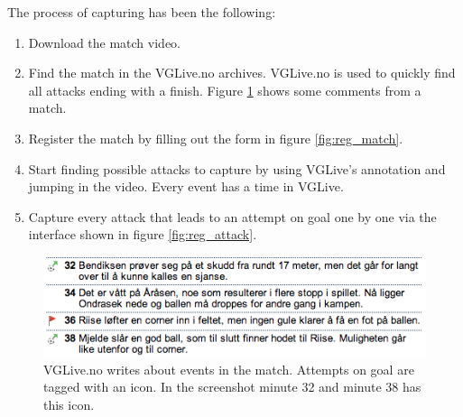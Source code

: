 The process of capturing has been the following:
\begin{enumerate}
\item Download the match video.
\item Find the match in the VGLive.no archives. VGLive.no is used to quickly find all attacks ending with a finish. Figure \ref{fig:vglive} shows some comments from a match.
\item Register the match by filling out the form in figure \ref{fig:reg_match}.
\item Start finding possible attacks to capture by using VGLive's annotation and jumping in the video. Every event has a time in VGLive.
\item Capture every attack that leads to an attempt on goal one by one via the interface shown in figure \ref{fig:reg_attack}.
\end{enumerate}

\begin{figure}[ht!]
\centering
\includegraphics[width=1\textwidth]{images/demo/vglive}
\caption{VGLive.no writes about events in the match. Attempts on goal are tagged with an icon. In the screenshot minute 32 and minute 38 has this icon.}
\label{fig:vglive}
\end{figure}










